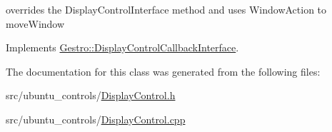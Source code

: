 overrides the Display\+Control\+Interface method and uses Window\+Action to move\+Window 

Implements \hyperlink{classGestro_1_1DisplayControlCallbackInterface_a5232eef7102a1db6d227189132c92ebd}{Gestro\+::\+Display\+Control\+Callback\+Interface}.



The documentation for this class was generated from the following files\+:\begin{DoxyCompactItemize}
\item 
src/ubuntu\+\_\+controls/\hyperlink{DisplayControl_8h}{Display\+Control.\+h}\item 
src/ubuntu\+\_\+controls/\hyperlink{DisplayControl_8cpp}{Display\+Control.\+cpp}\end{DoxyCompactItemize}
